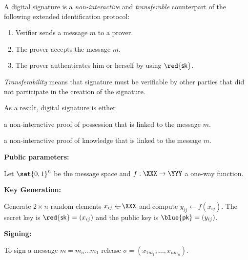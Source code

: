 \documentclass[landscape,footrule]{foils}
\renewcommand{\SK}{{\red{\mathsf{sk}}}}
\renewcommand{\PK}{{\blue{\mathsf{pk}}}}
\newcommand{\spreadappart}{\vspace*{\fill}}
\begin{document}

A digital signature is a \emph{non-interactive} and
\emph{transferable} counterpart of the following extended
identification protocol:
\begin{enumerate}
\item Verifier sends a message $m$ to a prover.
\item The prover accepts the message $m$.
\item The prover authenticates him or herself by using $\SK$.
\end{enumerate}
\bigskip\spreadappart

\emph{Transferability} means that signature must be verifiable by
other parties that did not participate in the creation of the
signature.
\bigskip\spreadappart

As a result, digital signature is either 
\begin{triangles}
\item a non-interactive proof of possession that is linked to the
  message $m$.
\item a non-interactive proof of knowledge that is linked to the
  message $m$.
\end{triangles}





\textbf{Public parameters:}\vspace*{1ex}\\
\hspace*{1em}
\begin{minipage}{0.92\linewidth}
  Let $\set{0,1}^n$ be the message space and $f:\XXX\to\YYY$ a one-way
  function.
\end{minipage}
\bigskip

\textbf{Key Generation:}\vspace*{1ex}\\
\hspace*{1em}
\begin{minipage}{0.92\linewidth}
  Generate $2\times n$ random elements $x_{ij}\getsu\XXX$
  and compute  $y_{ij}\gets f(x_{ij})$. The secret key is
  $\SK=(x_{ij})$ and the public key is $\PK=(y_{ij})$.
\end{minipage}
\bigskip

\textbf{Signing:}\vspace*{1ex}\\
\hspace*{1em}
\begin{minipage}{0.92\linewidth}
  To sign a message $m=m_n\ldots m_1$ release  $\sigma=(x_{1m_1},\ldots,x_{nm_n})$.
\end{minipage}
\bigskip
\end{document}
